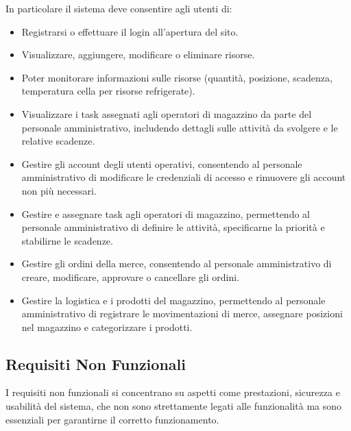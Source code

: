 In particolare il sistema deve consentire agli utenti di:
\begin{itemize}
    \item Registrarsi o effettuare il login all’apertura del sito.
    \item Visualizzare, aggiungere, modificare o eliminare risorse.
    \item Poter monitorare informazioni sulle risorse (quantità, posizione, scadenza, temperatura cella per risorse refrigerate).
    \item Visualizzare i task assegnati agli operatori di magazzino da parte del personale amministrativo, includendo dettagli sulle attività da svolgere e le relative scadenze.
    \item Gestire gli account degli utenti operativi, consentendo al personale amministrativo di modificare le credenziali di accesso e rimuovere gli account non più necessari.
    \item Gestire e assegnare task agli operatori di magazzino, permettendo al personale amministrativo di definire le attività, specificarne la priorità e stabilirne le scadenze.
    \item Gestire gli ordini della merce, consentendo al personale amministrativo di creare, modificare, approvare o cancellare gli ordini.
    \item Gestire la logistica e i prodotti del magazzino, permettendo al personale amministrativo di registrare le movimentazioni di merce, assegnare posizioni nel magazzino e categorizzare i prodotti.
\end{itemize}

\subsection{Requisiti Non Funzionali}

I requisiti non funzionali si concentrano su aspetti come prestazioni,
sicurezza e usabilità del sistema, che non sono strettamente legati alle funzionalità ma sono
essenziali per garantirne il corretto funzionamento.

